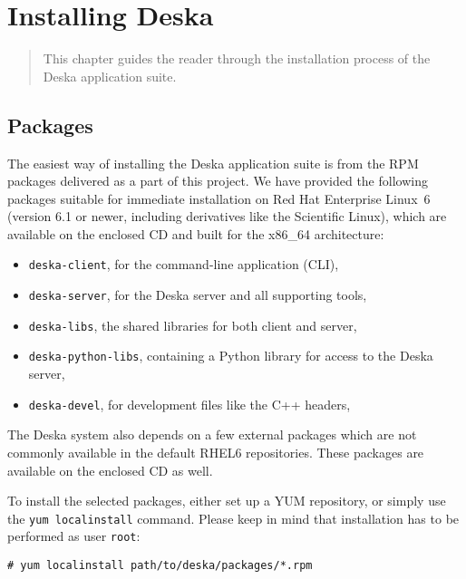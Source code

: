 \documentclass[deska]{subfiles}
\begin{document}
\chapter{Installing Deska}
\label{sec:building}

\begin{abstract}
This chapter guides the reader through the installation process of the Deska application suite.
\end{abstract}

\section{Packages}


The easiest way of installing the Deska application suite is from the RPM packages delivered as a part of this project.
We have provided the following packages suitable for immediate installation on Red Hat Enterprise Linux~6 \cite{rhel}
(version 6.1 or newer, including derivatives like the Scientific Linux), which are available on the enclosed CD and
built for the x86\_64 architecture:

\begin{itemize}
    \item {\tt deska-client}, for the command-line application (CLI),
    \item {\tt deska-server}, for the Deska server and all supporting tools,
    \item {\tt deska-libs}, the shared libraries for both client and server,
    \item {\tt deska-python-libs}, containing a Python library for access to the Deska server,
    \item {\tt deska-devel}, for development files like the C++ headers,
\end{itemize}

The Deska system also depends on a few external packages which are not commonly available in the default RHEL6
repositories.  These packages are available on the enclosed CD as well.

To install the selected packages, either set up a YUM repository, or simply use the {\tt yum localinstall} command.
Please keep in mind that installation has to be performed as user {\tt root}:

\begin{verbatim}
# yum localinstall path/to/deska/packages/*.rpm
\end{verbatim}
\end{document}
